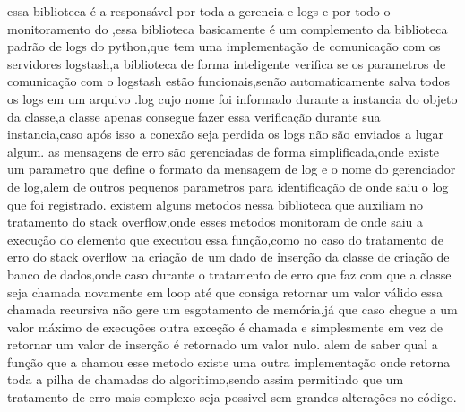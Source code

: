 \documentclass[
	12pt,				%
	openright,			%
	oneside,			%
	a4paper,			%
	english,			%
	french,				%
	spanish,			%
	brazil,				%
	]{abntex2}
\begin{document}
essa biblioteca é a responsável por toda a gerencia e logs e por todo o monitoramento do ,essa biblioteca basicamente é um complemento da biblioteca padrão de logs do python,que tem uma implementação de comunicação com os servidores logstash,a biblioteca de forma inteligente verifica se os parametros de comunicação com o logstash estão funcionais,senão automaticamente salva todos os logs em um arquivo .log cujo nome foi informado durante a instancia do objeto da classe,a classe apenas consegue fazer essa verificação durante sua instancia,caso após isso a conexão seja perdida os logs não são enviados a lugar algum.
as mensagens de erro são gerenciadas de forma simplificada,onde existe um parametro que define o formato da mensagem de log e o nome do gerenciador de log,alem de outros pequenos parametros para identificação de onde saiu o log que foi registrado.
existem alguns metodos nessa biblioteca que auxiliam no tratamento do stack overflow,onde esses metodos monitoram de onde saiu a execução do elemento que executou essa função,como no caso do tratamento de erro do stack overflow na criação de um dado de inserção da classe de criação de banco de dados,onde caso durante o tratamento de erro que faz com que a classe seja chamada novamente em loop até que consiga retornar um valor válido essa chamada recursiva não gere um esgotamento de memória,já que caso chegue a um valor máximo de execuções outra exceção é chamada e simplesmente em vez de retornar um valor de inserção é retornado um valor nulo.
alem de saber qual a função que a chamou esse metodo existe uma outra implementação onde retorna toda a pilha de chamadas do algoritimo,sendo assim permitindo que um tratamento de erro mais complexo seja possivel sem grandes alterações no código.
\end{document}
